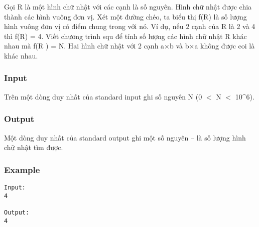 



   Gọi R là một hình chữ nhật với các cạnh là số nguyên. Hình chữ nhật được chia thành các hình vuông đơn vị. Xét một đường chéo, ta biểu thị f(R) là số lượng hình vuông đơn vị có điểm chung trong với nó. Ví dụ, nếu 2 cạnh của R là 2 và 4 thì f(R) = 4. Viết chương trình squ để tính số lượng các hình chữ nhật R khác nhau mà f(R ) = N. Hai hình chữ nhật với 2 cạnh a×b và b×a không được coi là khác nhau.  

\subsubsection{   Input  }

   Trên một dòng duy nhất của standard input ghi số nguyên N (0 $<$ N $<$ 10\textasciicircum6).  

\subsubsection{   Output  }

   Một dòng duy nhất của standard output ghi một số nguyên – là số lượng hình chữ nhật tìm được.  

\subsubsection{   Example  }
\begin{verbatim}
Input:
4

Output:
4
\end{verbatim}